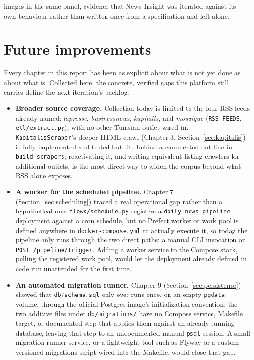\begin{sloppypar}
images in the same panel, evidence that News Insight was iterated against its own behaviour rather than written once from a specification and left alone.
\end{sloppypar}

\section{Future improvements}
\label{sec:future-improvements}
\begin{sloppypar}
Every chapter in this report has been as explicit about what is not yet done as about what is. Collected here, the concrete, verified gaps this platform still carries define the next iteration's backlog:
\end{sloppypar}

\begin{sloppypar}
\begin{itemize}
    \item \textbf{Broader source coverage.} Collection today is limited to the four RSS feeds already named: \textit{lapresse}, \textit{businessnews}, \textit{kapitalis}, and \textit{mosaique} (\texttt{RSS\_FEEDS}, \texttt{etl/extract.py}), with no other Tunisian outlet wired in. \texttt{KapitalisScraper}'s deeper HTML crawl (Chapter 3, Section~\ref{sec:kapitalis}) is fully implemented and tested but sits behind a commented-out line in \texttt{build\_scrapers}; reactivating it, and writing equivalent listing crawlers for additional outlets, is the most direct way to widen the corpus beyond what RSS alone exposes.
    \item \textbf{A worker for the scheduled pipeline.} Chapter 7 (Section~\ref{sec:scheduling}) traced a real operational gap rather than a hypothetical one: \texttt{flows/schedule.py} registers a \texttt{daily-news-pipeline} deployment against a cron schedule, but no Prefect worker or work pool is defined anywhere in \texttt{docker-compose.yml} to actually execute it, so today the pipeline only runs through the two direct paths: a manual CLI invocation or \texttt{POST /pipeline/trigger}. Adding a worker service to the Compose stack, polling the registered work pool, would let the deployment already defined in code run unattended for the first time.
    \item \textbf{An automated migration runner.} Chapter 9 (Section~\ref{sec:persistence}) showed that \texttt{db/schema.sql} only ever runs once, on an empty \texttt{pgdata} volume, through the official Postgres image's initialization convention; the two additive files under \texttt{db/migrations/} have no Compose service, Makefile target, or documented step that applies them against an already-running database, leaving that step to an undocumented manual \texttt{psql} session. A small migration-runner service, or a lightweight tool such as Flyway or a custom versioned-migrations script wired into the Makefile, would close that gap.

\end{itemize}
\end{sloppypar}
